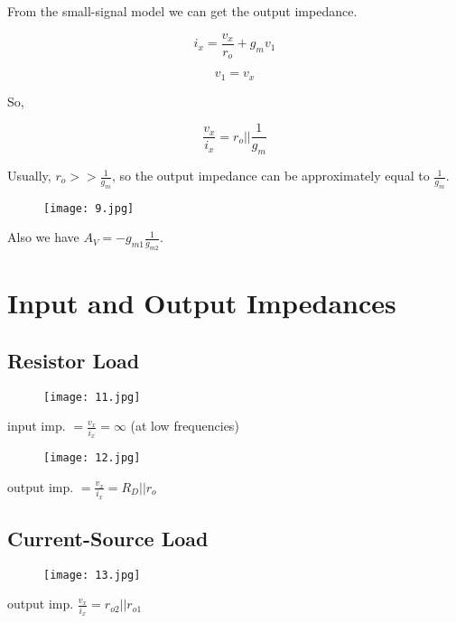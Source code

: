 \documentclass[fontset=windows]{article}
\begin{document}
From the small-signal model we can get the output impedance. 

$$i_x=\frac{v_x}{r_o}+g_mv_1$$

$$v_1=v_x$$

So, 

$$\frac{v_x}{i_x}=r_o||\frac{1}{g_m}$$

Usually, $r_o>>\frac{1}{g_m}$, so the output impedance can be approximately equal to $\frac{1}{g_m}$. 

\begin{figure}[htbp]
    \centering
    \texttt{[image: 9.jpg]}
    \captionsetup{labelformat=empty}
    \caption{}
    \label{10}
\end{figure}

Also we have $A_V=-g_{m1}\frac{1}{g_{m2}}$. 

\section*{Input and Output Impedances}

\subsection*{Resistor Load}

\begin{figure}[htbp]
    \centering
    \texttt{[image: 11.jpg]}
    \captionsetup{labelformat=empty}
    \caption{}
    \label{11}
\end{figure}

input imp. $=\frac{v_x}{i_x}=\infty$ (at low frequencies)

\begin{figure}[htbp]
    \centering
    \texttt{[image: 12.jpg]}
    \captionsetup{labelformat=empty}
    \caption{}
    \label{12}
\end{figure}

output imp. $=\frac{v_x}{i_x}=R_D||r_o$

\subsection*{Current-Source Load}

\begin{figure}[htbp]
    \centering
    \texttt{[image: 13.jpg]}
    \captionsetup{labelformat=empty}
    \caption{}
    \label{13}
\end{figure}

output imp. $\frac{v_x}{i_x}=r_{o2}||r_{o1}$
\end{document}
